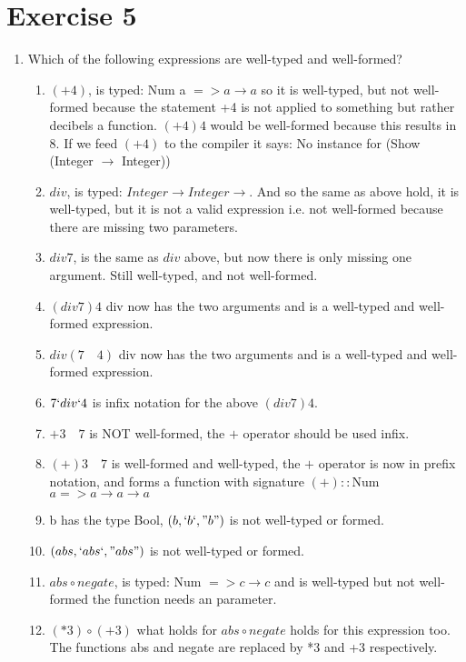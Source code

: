 \documentclass{article}
\begin{document}
\section*{Exercise 5}
\begin{enumerate}
    \item Which of the following expressions are well-typed and well-formed?
    \begin{enumerate}
        \item $(+4)$, is typed: Num a $=> a \rightarrow a$ so it is well-typed, but not well-formed because the statement +4 is not applied to something but rather decibels a function. $(+4) 4$ would be well-formed because this results in 8. If we feed $(+4)$ to the compiler it says: No instance for (Show (Integer $\rightarrow$ Integer))
        \item $div$, is typed: $Integer \rightarrow Integer \rightarrow$. And so the same as above hold, it is well-typed, but it is not a valid expression i.e. not well-formed because there are missing two parameters.
        \item $div 7$, is the same as $div$ above, but now there is only missing one argument. Still well-typed, and not well-formed.
        \item $(div 7) 4$ div now has the two arguments and is a well-typed and well-formed expression. 
        \item $div (7 \quad 4)$ div now has the two arguments and is a well-typed and well-formed expression. 
        \item $7 `div` 4$ is infix notation for the above $(div 7) 4$. 
        \item $+ 3 \quad 7$ is NOT well-formed, the $+$ operator should be used infix.
        \item $(+) 3 \quad 7$ is well-formed and well-typed, the $+$ operator is now in prefix notation, and forms a function with signature $(+)::$Num $a => a \rightarrow a \rightarrow a$
        \item b has the type Bool, $(b, `b`, "b")$ is not well-typed or formed.
        \item $(abs, `abs`, "abs")$ is not well-typed or formed.
        \item $abs \circ negate$, is typed: Num $=> c \rightarrow c$ and is well-typed but not well-formed the function needs an parameter.
        \item $(*3) \circ (+3)$ what holds for $abs \circ negate$ holds for this expression too. The functions abs and negate are replaced by *3 and +3 respectively. 

\end{enumerate}
\end{enumerate}
\end{document}
